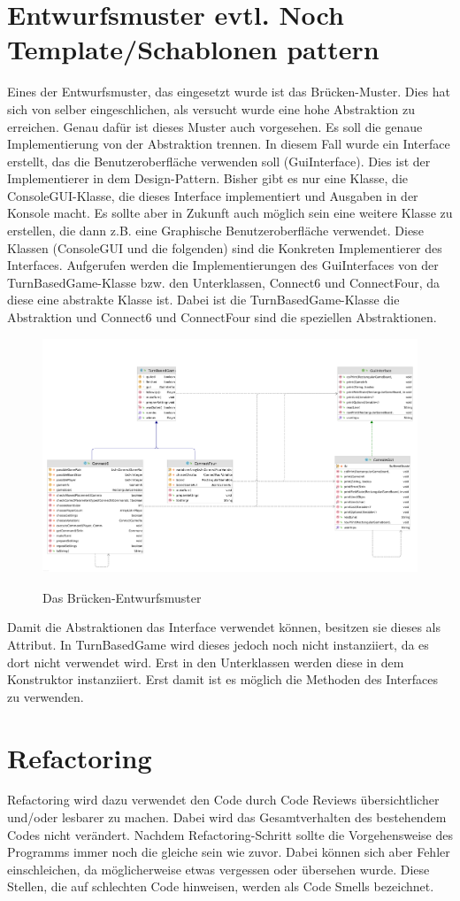 \documentclass[12pt]{article}
\newcommand{\BridgePattern}{\includegraphics[height=7cm]{Bilder/Bridge_complete}}
\begin{document}
\newpage
\section{Entwurfsmuster evtl. Noch Template/Schablonen pattern}
Eines der Entwurfsmuster, das eingesetzt wurde ist das Brücken-Muster. Dies hat sich von selber eingeschlichen, als versucht wurde eine hohe Abstraktion zu erreichen. Genau dafür ist dieses Muster auch vorgesehen. Es soll die genaue Implementierung von der Abstraktion trennen. In diesem Fall wurde ein Interface erstellt, das die Benutzeroberfläche verwenden soll (GuiInterface). Dies ist der Implementierer in dem Design-Pattern. Bisher gibt es nur eine Klasse, die ConsoleGUI-Klasse, die dieses Interface implementiert und Ausgaben in der Konsole macht. Es sollte aber in Zukunft auch möglich sein eine weitere Klasse zu erstellen, die dann z.B. eine Graphische Benutzeroberfläche verwendet. Diese Klassen (ConsoleGUI und die folgenden) sind die Konkreten Implementierer des Interfaces. Aufgerufen werden die Implementierungen des GuiInterfaces von der TurnBasedGame-Klasse bzw. den Unterklassen, Connect6 und ConnectFour, da diese eine abstrakte Klasse ist. Dabei ist die TurnBasedGame-Klasse die Abstraktion und Connect6 und ConnectFour sind die speziellen Abstraktionen.

\begin{figure}[htpb!]
\centering
{\BridgePattern}\\[1cm]
\caption{Das Brücken-Entwurfsmuster}
\label{fig:bridge}
\end{figure}

Damit die Abstraktionen das Interface verwendet können, besitzen sie dieses als Attribut. In TurnBasedGame wird dieses jedoch noch nicht instanziiert, da es dort nicht verwendet wird. Erst in den Unterklassen werden diese in dem Konstruktor instanziiert. Erst damit ist es möglich die Methoden des Interfaces zu verwenden.

\newpage
\section{Refactoring}
Refactoring wird dazu verwendet den Code durch Code Reviews übersichtlicher und/oder lesbarer zu machen. Dabei wird das Gesamtverhalten des bestehendem Codes nicht verändert. Nachdem Refactoring-Schritt sollte die Vorgehensweise des Programms immer noch die gleiche sein wie zuvor. Dabei können sich aber Fehler einschleichen, da möglicherweise etwas vergessen oder übersehen wurde.
Diese Stellen, die auf \glqq schlechten \grqq Code hinweisen, werden als Code Smells bezeichnet.
\end{document}
